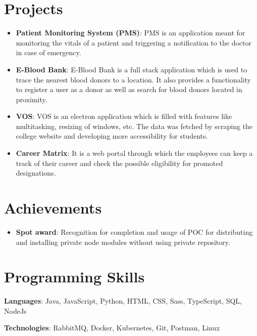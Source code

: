 \documentclass[letterpaper,11pt]{article}
\newcommand{\resumeItem}[2]{
  \item\small{
    \textbf{#1}{: #2 \vspace{-2pt}}
  }
}
\newcommand{\resumeSubItem}[2]{\resumeItem{#1}{#2}\vspace{-4pt}}
\newcommand{\resumeSubHeadingListStart}{\begin{itemize}[leftmargin=*]}
\newcommand{\resumeSubHeadingListEnd}{\end{itemize}}
\begin{document}
\section{Projects}
  \resumeSubHeadingListStart
    \resumeSubItem{Patient Monitoring System (PMS)}
      {PMS is an application meant for monitoring the vitals of a patient and triggering a notification to the doctor in case of emergency.}
    \resumeSubItem{E-Blood Bank}
      {E-Blood Bank is a full stack application which is used to trace the nearest blood donors to a location. It also provides a functionality to register a user as a donor as well as search for blood donors located in proximity.}
    \resumeSubItem{VOS}
      {VOS is an electron application which is filled with features like multitasking, resizing of windows, etc. The data was fetched by scraping the college website and developing more accessibility for students.}
    \resumeSubItem{Career Matrix}
      {It is a web portal through which the employees can keep a track of their career and check the possible eligibility for promoted designations.}
  \resumeSubHeadingListEnd
\section{Achievements}
  \resumeSubHeadingListStart
    \resumeSubItem{Spot award}
      {Recognition for completion and usage of POC for distributing and installing private node modules without using private repository.}
  \resumeSubHeadingListEnd

%
\section{Programming Skills}
 \resumeSubHeadingListStart
   \item{
     \textbf{Languages}{:  Java, JavaScript, Python, HTML, CSS, Sass, TypeScript, SQL, NodeJs}
    \item
     \textbf{Technologies}{: RabbitMQ, Docker, Kubernetes, Git, Postman, Linux}
   }
 \resumeSubHeadingListEnd


\end{document}
